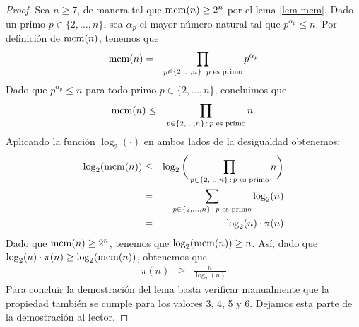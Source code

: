 	\begin{proof}
	Sea $n \geq 7$, de manera tal que ${\rm mcm}(n) \geq 2^n$ por el lema \ref{lem-mcm}.
	Dado un primo $p \in \{2, \ldots, n\}$, sea $\alpha_p$ el mayor número natural tal que $p^{\alpha_p} \leq n$. Por definición de ${\rm mcm}(n)$, tenemos que
	\begin{eqnarray*}
		{\rm mcm}(n) & = & \prod_{p \in \{2, \ldots, n\} \,:\, p \text{ es primo}} p^{\alpha_p}
	\end{eqnarray*}
	Dado que $p^{\alpha_p} \leq n$ para todo primo $p \in \{2, \ldots, n\}$,
        concluimos que
\begin{eqnarray*}
		{\rm mcm}(n) & \leq & \prod_{p \in \{2, \ldots, n\} \,:\, p \text{ es primo}} n.
	\end{eqnarray*}
	Aplicando la función $\log_2(\cdot)$ en ambos lados de la desigualdad obtenemos:
	\begin{eqnarray*}
		\log_2({\rm mcm}(n)) & \leq & \log_2\bigg(\prod_{p \in \{2, \ldots, n\} \,:\, p \text{ es primo}} n\bigg)\\
		& = & \sum_{p \in \{2, \ldots, n\} \,:\, p \text{ es primo}} \log_2(n)\\
		& = & \log_2(n) \cdot \pi(n)
		\end{eqnarray*}
Dado que 	${\rm mcm}(n) \geq 2^n$, tenemos que $\log_2({\rm mcm}(n)) \geq n$. Así, dado que $\log_2(n) \cdot \pi(n) \geq \log_2({\rm mcm}(n))$, obtenemos que
	\begin{eqnarray*}
		\pi(n) & \geq &\frac{n}{\log_2(n)}
	\end{eqnarray*}	
	Para concluir la demostración del lema basta verificar manualmente que la propiedad también se cumple para los valores 3, 4, 5 y 6. Dejamos esta parte de la demostración al lector.
	\end{proof}
	
    
